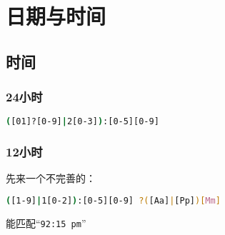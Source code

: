 \chapter{日期与时间}



\section{时间}

\subsection{24小时}

\begin{lstlisting}[language=bash]
([01]?[0-9]|2[0-3]):[0-5][0-9]
\end{lstlisting}

\subsection{12小时}

先来一个不完善的：

\begin{lstlisting}[language=bash]
([1-9]|1[0-2]):[0-5][0-9] ?([Aa]|[Pp])[Mm]
\end{lstlisting}

能匹配“\verb|92:15 pm|”


